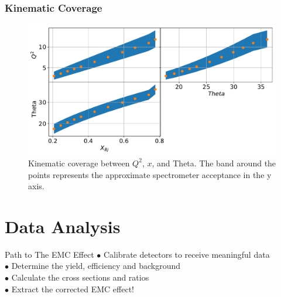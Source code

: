 \documentclass[12pt,usenames,dvipsnames]{beamer}
\begin{document}
\begin{frame}
\frametitle{Kinematic Coverage}

\begin{figure}[h]
	\vspace*{-1.5cm}
	\centering
	\includegraphics[width=12.cm]{../images/Thesis/KinCov.pdf}
	\caption*{Kinematic coverage between $Q^2$, $x$, and Theta. The band around the points represents the approximate spectrometer acceptance in the y axis.}
	\label{fig:kincov}
\end{figure}
\end{frame}
\section[Analysis]{Data Analysis}
\begin{frame}
{\centering\huge{Path to The EMC Effect}}
\Large{
$\bullet$ Calibrate detectors to receive meaningful data\\
$\bullet$ Determine the yield, efficiency and background\\
$\bullet$ Calculate the cross sections and ratios\\
$\bullet$ Extract the corrected EMC effect!
}
\end{frame}
\end{document}
